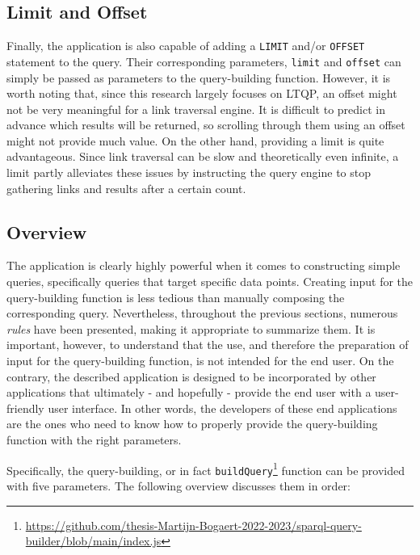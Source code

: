 \subsection{Limit and Offset}
\label{subsec:limit_offset}

Finally, the application is also capable of adding a \texttt{LIMIT} and/or \texttt{OFFSET} statement to the query. Their corresponding parameters, \texttt{limit} and \texttt{offset} can simply be passed as parameters to the query-building function. However, it is worth noting that, since this research largely focuses on LTQP, an offset might not be very meaningful for a link traversal engine. It is difficult to predict in advance which results will be returned, so scrolling through them using an offset might not provide much value. On the other hand, providing a limit is quite advantageous. Since link traversal can be slow and theoretically even infinite, a limit partly alleviates these issues by instructing the query engine to stop gathering links and results after a certain count.

\subsection{Overview}

The application is clearly highly powerful when it comes to constructing simple queries, specifically queries that target specific data points. Creating input for the query-building function is less tedious than manually composing the corresponding query. Nevertheless, throughout the previous sections, numerous \textit{rules} have been presented, making it appropriate to summarize them. It is important, however, to understand that the use, and therefore the preparation of input for the query-building function, is not intended for the end user. On the contrary, the described application is designed to be incorporated by other applications that ultimately - and hopefully - provide the end user with a user-friendly user interface. In other words, the developers of these end applications are the ones who need to know how to properly provide the query-building function with the right parameters.

Specifically, the query-building, or in fact \texttt{buildQuery}\footnote{\url{https://github.com/thesis-Martijn-Bogaert-2022-2023/sparql-query-builder/blob/main/index.js}} function can be provided with five parameters. The following overview discusses them in order:

